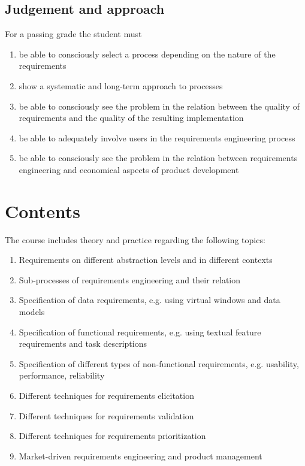 \documentclass[10pt,a4paper]{article}
\begin{document}
\subsection{Judgement and approach}
For a passing grade the student must
\begin{enumerate}[noitemsep]
\item     be able to consciously select a process depending on the nature of the requirements
\item     show a systematic and long-term approach to processes
\item     be able to consciously see the problem in the relation between the quality of requirements and the quality of the resulting implementation
\item     be able to adequately involve users in the requirements engineering process
\item     be able to consciously see the problem in the relation between requirements engineering and economical aspects of product development
\end{enumerate}

\section{Contents}
The course includes theory and practice regarding the following topics:
\begin{enumerate}[noitemsep]
\item Requirements on different abstraction levels and in different contexts

\item Sub-processes of requirements engineering and their relation

\item Specification of data requirements, e.g. using virtual windows and data models

\item Specification of functional requirements, e.g. using textual feature requirements and task descriptions

\item Specification of different types of non-functional requirements, e.g. usability, performance, reliability

\item Different techniques for requirements elicitation

\item Different techniques for requirements validation

\item Different techniques for requirements prioritization

\item Market-driven requirements engineering and product management
\end{enumerate}
\end{document}
